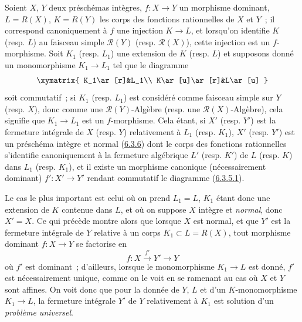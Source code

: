 \begin{env}[6.3.9]
\label{II.6.3.9-fr}
Soient $X$, $Y$ deux préschémas intègres, $f:X\to Y$ un morphisme dominant,
$L=R(X)$, $K=R(Y)$ les corps des fonctions rationnelles de $X$ et $Y$~; il
correspond canoniquement à $f$ une injection $K\to L$, et lorsqu'on identifie
$K$ (resp. $L$) au faisceau simple $\mathcal{R}(Y)$ (resp.
$\mathcal{R}(X)$), cette injection est un $f$-morphisme. Soit $K_1$ (resp.
$L_1$) une extension de $K$ (resp. $L$) et supposons donné un monomorphisme
$K_1\to L_1$ tel que le diagramme
\[
\xymatrix{
K_1\ar[r]&L_1\\
K\ar[u]\ar[r]&L\ar[u]
}
\]
soit commutatif~; si $K_1$ (resp. $L_1$) est considéré comme faisceau simple
sur $Y$ (resp. $X$), donc comme une $\mathcal{R}(Y)$-Algèbre (resp. une
$\mathcal{R}(X)$-Algèbre), cela signifie que $K_1\to L_1$ est un
$f$-morphisme. Cela étant, si $X'$ (resp. $Y'$) est la fermeture intégrale de
$X$ (resp. $Y$) relativement à $L_1$ (resp. $K_1$), $X'$ (resp. $Y'$) est un
préschéma intègre et normal (\hyperref[II.6.3.6-fr]{6.3.6}) dont le corps des
fonctions rationnelles s'identifie canoniquement à la fermeture algébrique
$L'$ (resp. $K'$) de $L$ (resp. $K$) dans $L_1$ (resp. $K_1$), et il existe
un morphisme canonique (nécessairement dominant) $f':X'\to Y'$ rendant
commutatif le diagramme (\hyperref[II.6.3.5.1-fr]{6.3.5.1}).

Le cas le plus important est celui où on prend $L_1=L$, $K_1$ étant donc une
extension de $K$ contenue dans $L$, et où on suppose $X$ intègre et
\emph{normal}, donc $X'=X$. Ce qui précède montre alors que lorsque $X$ est
normal, et que $Y'$ est la fermeture intégrale de $Y$ relative à un corps
$K_1\subset L=R(X)$, tout morphisme dominant $f:X\to Y$ se factorise en
\[
f:X\xrightarrow{f'}Y'\to Y
\]
où $f'$ est dominant~; d'ailleurs, lorsque le monomorphisme $K_1\to L$ est
donné, $f'$ est nécessairement unique, comme on le voit en se ramenant au cas
où $X$ et $Y$ sont affines. On voit donc que pour la donnée de $Y$, $L$ et
d'un $K$-monomorphisme $K_1\to L$, la fermeture intégrale $Y'$ de $Y$
relativement à $K_1$ est solution d'un \emph{problème universel}.
\end{env}

